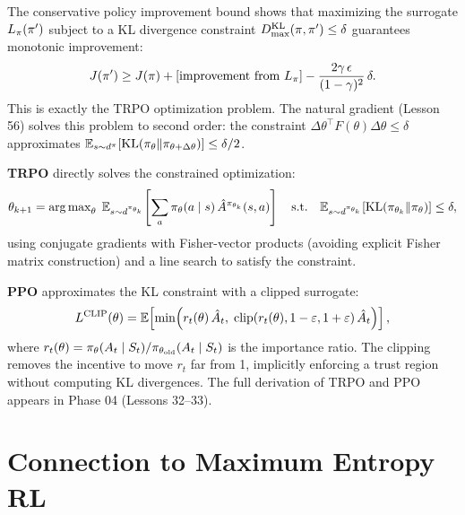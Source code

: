 \documentclass[11pt,a4paper]{article}
\begin{document}
\begin{keyresult}[title={From Natural Gradient to Trust Regions}]
The conservative policy improvement bound shows that maximizing the
surrogate $L_\pi(\pi')$ subject to a KL divergence constraint
$D_{\max}^{\operatorname{KL}}(\pi, \pi') \leq \delta$ guarantees monotonic
improvement:
\[
  J(\pi') \geq J(\pi) + \left[\text{improvement from }
  L_\pi\right] - \frac{2\gamma\, \epsilon}{(1-\gamma)^2}\,
  \delta.
\]
This is exactly the TRPO optimization problem. The natural gradient
(Lesson 56) solves this problem to second order: the constraint
$\Delta\theta^\top F(\theta) \Delta\theta \leq \delta$ approximates
$\mathbb{E}_{s \sim d^\pi}[\operatorname{KL}(\pi_\theta \| \pi_{\theta +
\Delta\theta})] \leq \delta/2$.
\end{keyresult}

\begin{rlconnection}[title={Preview: TRPO and PPO}]
\textbf{TRPO} \citep{schulman2015trpo} directly solves the
constrained optimization:
\[
  \theta_{k+1} = \operatorname{arg\,max}_\theta\;
  \mathbb{E}_{s \sim d^{\pi_{\theta_k}}}\!\left[\sum_a \pi_\theta(a \mid s)\,
  \hat{A}^{\pi_{\theta_k}}(s,a)\right]
  \quad \text{s.t.} \quad
  \mathbb{E}_{s \sim d^{\pi_{\theta_k}}}\!\left[
  \operatorname{KL}(\pi_{\theta_k} \| \pi_\theta)\right] \leq \delta,
\]
using conjugate gradients with Fisher-vector products (avoiding
explicit Fisher matrix construction) and a line search to satisfy the
constraint.

\textbf{PPO} \citep{schulman2017} approximates the KL constraint
with a clipped surrogate:
\[
  L^{\mathrm{CLIP}}(\theta) = \mathbb{E}\!\left[\min\!\left(
  r_t(\theta)\, \hat{A}_t,\;
  \mathrm{clip}(r_t(\theta), 1-\varepsilon, 1+\varepsilon)\, \hat{A}_t
  \right)\right],
\]
where $r_t(\theta) = \pi_\theta(A_t \mid S_t) /
\pi_{\theta_{\mathrm{old}}}(A_t \mid S_t)$ is the importance
ratio. The clipping removes the incentive to move $r_t$ far from 1,
implicitly enforcing a trust region without computing KL divergences.
The full derivation of TRPO and PPO appears in Phase 04 (Lessons 32--33).
\end{rlconnection}

\section{Connection to Maximum Entropy RL}
\label{sec:maxent}
\end{document}
